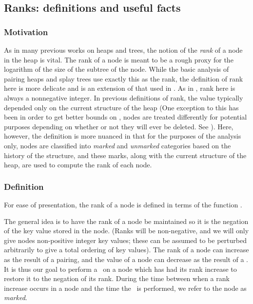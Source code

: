 \subsection{Ranks: definitions and useful facts} 

\subsubsection{Motivation}

As in many previous works on heaps and trees, the notion of the \emph{rank} of a node in the heap is vital. The rank of a node is meant to be a rough proxy for the logarithm of the size of the subtree of the node. While the basic analysis of pairing heaps and splay trees \cite{DBLP:journals/algorithmica/FredmanSST86,DBLP:journals/jacm/SleatorT85} use exactly this as the rank, the definition of rank here is more delicate and is an extension of that used in \cite{DBLP:journals/jacm/Fredman99}. As in \cite{DBLP:journals/jacm/Fredman99}, rank here is always a nonnegative integer. In previous definitions of rank, the value typically depended only on the current structure of the heap (One exception to this has been in order to get better bounds on \opIns, nodes are treated differently for potential purposes depending on whether or not they will ever be deleted. See \cite{DBLP:journals/cacm/StaskoV87,DBLP:journals/corr/abs-1110-4428,DBLP:conf/swat/Iacono00}). Here, however, the definition is more nuanced in that for the purposes of the analysis only, nodes are classified into \emph{marked} and \emph{unmarked} categories based on the history of the structure, and these marks, along with the current structure of the heap, are used to compute the rank of each node. 


\subsubsection{Definition} 



For ease of presentation, the rank of a node is defined in terms of the function .
\begin{fullonly}

\end{fullonly}
The general idea is to have the rank of a node be maintained so it is the negation of the key value stored in the node. (Ranks will be non-negative, and we will only give nodes non-positive integer key values; these can be assumed to be perturbed arbitrarily to give a total ordering of key values). The rank of a node can increase as the result of a pairing, and the value of a node can decrease as the result of a \opDc. It is thus our goal to perform a \opDc\ on a node which has had its rank increase to restore it to the negation of its rank. During the time between when a rank increase occurs in a node and the time the \opDc\ is performed, we refer to the node as \emph{marked}. 

